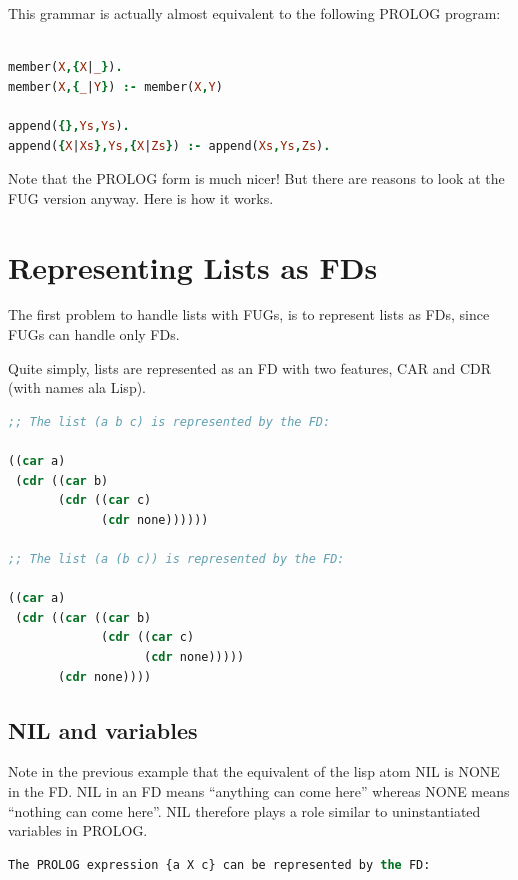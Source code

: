 \documentclass[10pt,a4paper]{report}
\begin{document}
\begin{appendices}
This grammar is actually almost equivalent to the following PROLOG program:

\begin{lstlisting}[language=Prolog]

member(X,{X|_}).
member(X,{_|Y}) :- member(X,Y)

append({},Ys,Ys).
append({X|Xs},Ys,{X|Zs}) :- append(Xs,Ys,Zs).

\end{lstlisting}

Note that the PROLOG form is much nicer! But there are reasons to
look at the FUG version anyway. Here is how it works.



\section{Representing Lists as FDs}

The first problem to handle lists with FUGs, is to represent
lists as FDs, since FUGs can handle only FDs.

Quite simply, lists are represented as an FD with two features,
CAR and CDR (with names ala Lisp). 

\begin{lstlisting}[language=Lisp]
;; The list (a b c) is represented by the FD:

((car a)
 (cdr ((car b)
       (cdr ((car c)
             (cdr none))))))

;; The list (a (b c)) is represented by the FD:

((car a)
 (cdr ((car ((car b)
             (cdr ((car c)
                   (cdr none)))))
       (cdr none))))
\end{lstlisting}

\subsection{NIL and variables}

Note in the previous example that the equivalent of the lisp atom
NIL is NONE in the FD. NIL in an FD means ``anything can come
here'' whereas NONE means ``nothing can come here''. NIL therefore
plays a role similar to uninstantiated variables in PROLOG.

\begin{lstlisting}[language=Lisp]
The PROLOG expression {a X c} can be represented by the FD:


\end{lstlisting}
\end{appendices}
\end{document}
